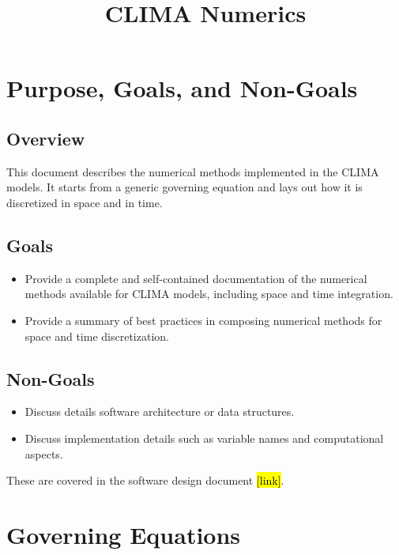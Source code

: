 \documentclass{report}
\title{CLIMA Numerics}
\author{ }
\begin{document}
\maketitle
\tableofcontents

\chapter{Purpose, Goals, and Non-Goals}

\section{Overview}

This document describes the numerical methods implemented in the CLIMA models. It starts from a generic governing equation and lays out how it is discretized in space and in time. 

\section{Goals}

\begin{itemize}
    \item Provide a complete and self-contained documentation of the numerical methods available for CLIMA models, including space and time integration.
    \item Provide a summary of best practices in composing numerical methods for space and time discretization.
\end{itemize}

\section{Non-Goals}

\begin{itemize}
    \item Discuss details software architecture or data structures.
    \item Discuss implementation details such as variable names and computational aspects.
\end{itemize}
These are covered in the software design document \hl{[link]}.

\chapter{Governing Equations}\label{ch:gov_equations}
\end{document}
